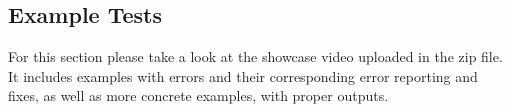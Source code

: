 \subsection{Example Tests}
For this section please take a look at the showcase video uploaded in the zip file. It includes examples with errors and their corresponding error reporting and fixes, as well as more concrete examples, with proper outputs.